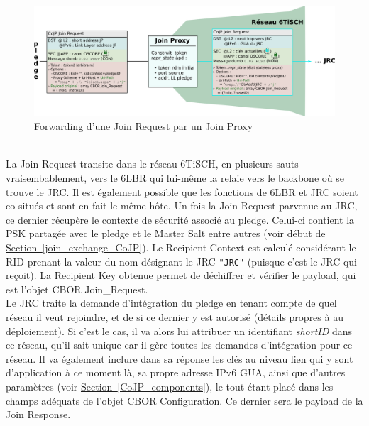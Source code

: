 \documentclass[]{report}
\newcommand{\minit}[1]{\noindent{\small\textbf{ \underline{#1}}}~\\}
\newcommand{\wordlink}[2]{\hyperref[#2]{#1~\ref{#2}}}
\begin{document}
\newpage

\vspace{0.2cm}
	\begin{figure}[!h]
	\centering
	\includegraphics[width=\linewidth]{Join_Request}
	\caption{Forwarding d'une Join Request par un Join Proxy}
	\label{fig:join_request}
	\end{figure}
\vspace{0.2cm}

\minit{JP $\rightarrow$ JRC (Join Request)}

La Join Request transite dans le réseau 6TiSCH, en plusieurs sauts vraisembablement, vers le 6LBR qui lui-même la relaie vers le backbone où se trouve le JRC. Il est également possible que les fonctions de 6LBR et JRC soient co-situés et sont en fait le même hôte. Un fois la Join Request parvenue au JRC, ce dernier récupère le contexte de sécurité associé au pledge. Celui-ci contient la PSK partagée avec le pledge et le Master Salt entre autres (voir début de \wordlink{Section}{join_exchange_CoJP}). Le Recipient Context est calculé considérant le RID prenant la valeur du nom désignant le JRC \texttt{"JRC"} (puisque c'est le JRC qui reçoit). La Recipient Key obtenue permet de déchiffrer et vérifier le payload, qui est l'objet CBOR Join\_Request.\\

Le JRC traite la demande d'intégration du pledge en tenant compte de quel réseau il veut rejoindre, et de si ce dernier y est autorisé (détails propres à au déploiement). Si c'est le cas, il va alors lui attribuer un identifiant \textit{shortID} dans ce réseau, qu'il sait unique car il gère toutes les demandes d'intégration pour ce réseau. Il va également inclure dans sa réponse les clés au niveau lien qui y sont d'application à ce moment là, sa propre adresse IPv6 GUA, ainsi que d'autres paramètres (voir \wordlink{Section}{CoJP_components}), le tout étant placé dans les champs adéquats de l'objet CBOR Configuration. Ce dernier sera le payload de la Join Response.\\
\end{document}
